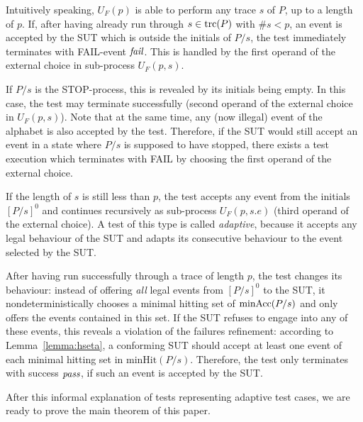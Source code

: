 Intuitively speaking, $U_F(p)$ is able to perform any trace $s$ of $P$, 
up to a length of $p$. 
If, after having already run through $s\in\text{trc}(P)$ with $\#s < p$,
an event is accepted by the SUT which is outside the initials of $P/s$, the test 
immediately terminates with FAIL-event ${\text{\it fail}}$. This is handled by the first operand of the
external choice in sub-process $U_F(p,s)$.

If $P/s$ is the STOP-process, this is revealed by its initials being empty. In this case, the test may terminate 
successfully (second operand of the external choice in $U_F(p,s)$). Note that at the same time, any (now illegal) event of the alphabet is also accepted by the test.
Therefore,
if the SUT would still accept an event in a state where $P/s$ is supposed to have stopped, there exists a test execution which terminates with FAIL by choosing the first
operand of the external choice.

If the length of $s$ is still less than $p$, the test accepts any event from the initials
$[P/s]^0$ and continues recursively as sub-process $U_F(p,s.e)$ (third operand of the external choice). A test of this type is called \emph{adaptive}, because it accepts any legal behaviour of the SUT and adapts its consecutive behaviour to the event selected by the SUT.
 
After having  run successfully 
through a trace of length $p$, the test changes its behaviour:
instead of offering {\it all} legal events from $[P/s]^0$ to the SUT, 
it nondeterministically chooses 
a minimal hitting set of $\text{minAcc}(P/s)$ and only offers the events contained in this set.
If the SUT refuses to engage into any of these events, this reveals a violation of the
failures refinement: according to Lemma~\ref{lemma:hseta}, a conforming SUT should accept
at least one event of each minimal hitting set in $\text{minHit}(P/s)$. Therefore, the test
only terminates with success ${\text{\it pass}}$, if such an event is accepted by the SUT.

After this informal explanation of tests representing adaptive test cases, we are ready to prove the main theorem of this paper.

